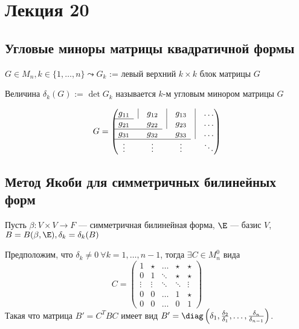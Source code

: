 \section{Лекция 20}


\subsection{Угловые миноры матрицы квадратичной формы}

$G \in M_{n}, k \in \{1, \dots, n\} \leadsto G_{k}$ := левый верхний $k \times k$ блок матрицы $G$

\begin{definition}
    Величина $\delta_k (G)$ := $\det G_{k}$ называется $k$-м угловым минором матрицы $G$    

\begin{equation*}
G = \begin{pmatrix}
        g_{11} & \vline & g_{12} & \vline & g_{13} & \vline & \dots \\ 
        \cline{1-1}
        g_{21} &        & g_{22} & \vline & g_{23} & \vline & \dots \\ 
        \cline{1-3}
        g_{31} &        & g_{32} &        & g_{33} & \vline & \dots \\
        \cline{1-5}
        \vdots &        & \vdots &        & \vdots &        & \ddots
    \end{pmatrix}
\end{equation*}


\end{definition}

\subsection{Метод Якоби для симметричных билинейных форм}

Пусть $\beta \colon V \times V \to F$ --- симметричная билинейная форма, $\E$ --- базис $V$, $B = B(\beta, \E), \delta_{k} = \delta_k(B)$

\begin{theorem}
    Предположим, что $\delta_{k} \neq 0  \ \forall k = 1, \dots, n-1$, тогда $\exists C \in M^{0}_{n}$ вида
    \begin{equation*}
    C = \begin{pmatrix} 
        1 & \star & \dots & \star & \star \\
        0 & 1 & \ddots & \star & \star \\
        \vdots & \vdots & \ddots & \ddots & \vdots \\
        0 & 0 & \dots & 1 & \star \\
        0 & 0 & \dots & 0 & 1
    \end{pmatrix}
    \end{equation*}
    Такая что матрица $B' = C^{T} B C$ имеет вид $B' = \diag\left(\delta_1, \frac{\delta_2}{\delta_1}, \dots, \frac{\delta_n}{\delta_{n - 1}}\right)$.
\end{theorem}

